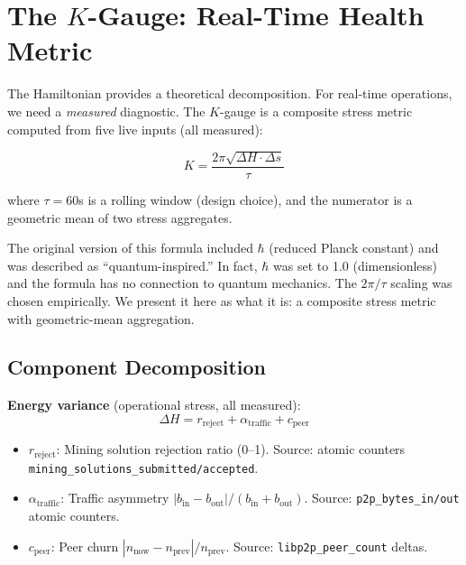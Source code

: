 \documentclass[11pt,a4paper,twocolumn]{article}
\begin{document}
\section{The $K$-Gauge: Real-Time Health Metric}

The Hamiltonian provides a theoretical decomposition. For real-time operations, we need a \emph{measured} diagnostic. The $K$-gauge is a composite stress metric computed from five live inputs (\textcolor{measured}{all measured}):

\begin{equation}
K = \frac{2\pi\sqrt{\Delta H \cdot \Delta s}}{\tau}
\label{eq:kgauge}
\end{equation}

where $\tau = 60$s is a rolling window (design choice), and the numerator is a geometric mean of two stress aggregates.

\begin{honestybox}
The original version of this formula included $\hbar$ (reduced Planck constant) and was described as ``quantum-inspired.'' In fact, $\hbar$ was set to 1.0 (dimensionless) and the formula has no connection to quantum mechanics. The $2\pi/\tau$ scaling was chosen empirically. We present it here as what it is: a composite stress metric with geometric-mean aggregation.
\end{honestybox}

\subsection{Component Decomposition}

\textbf{Energy variance} (operational stress, \textcolor{measured}{all measured}):
\begin{equation}
\Delta H = r_{\text{reject}} + \alpha_{\text{traffic}} + c_{\text{peer}}
\end{equation}
\begin{itemize}[nosep]
    \item $r_{\text{reject}}$: Mining solution rejection ratio (0--1). Source: atomic counters \texttt{mining\_solutions\_submitted/accepted}.
    \item $\alpha_{\text{traffic}}$: Traffic asymmetry $|b_{\text{in}} - b_{\text{out}}| / (b_{\text{in}} + b_{\text{out}})$. Source: \texttt{p2p\_bytes\_in/out} atomic counters.
    \item $c_{\text{peer}}$: Peer churn $|n_{\text{now}} - n_{\text{prev}}| / n_{\text{prev}}$. Source: \texttt{libp2p\_peer\_count} deltas.
\end{itemize}
\end{document}
